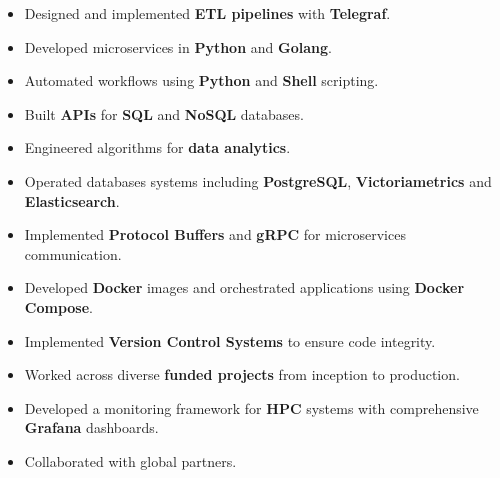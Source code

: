 \documentclass[10pt,a4paper,ragged2e,withhyper]{altacv}
\begin{document}
\begin{paracol}{2}
      \begin{itemize}
            \item Designed and implemented \textcolor{heading}{\textbf{ETL pipelines}} with
                  \textcolor{heading}{\textbf{Telegraf}}.
            \item Developed microservices in \textcolor{heading}{\textbf{Python}} and
                  \textcolor{heading}{\textbf{Golang}}.
            \item Automated workflows using \textcolor{heading}{\textbf{Python}} and
                  \textcolor{heading}{\textbf{Shell}} scripting.
            \item Built \textcolor{heading}{\textbf{APIs}} for \textcolor{heading}{\textbf{SQL}}
                  and \textcolor{heading}{\textbf{NoSQL}} databases.
            \item Engineered algorithms for \textcolor{heading}{\textbf{data analytics}}.
            \item Operated databases systems including \textcolor{heading}{\textbf{PostgreSQL}},
                  \textcolor{heading}{\textbf{Victoriametrics}} and
                  \textcolor{heading}{\textbf{Elasticsearch}}.
            \item Implemented \textcolor{heading}{\textbf{Protocol Buffers}} and
                  \textcolor{heading}{\textbf{gRPC}} for microservices communication.
            \item Developed \textcolor{heading}{\textbf{Docker}} images and orchestrated
                  applications using \textcolor{heading}{\textbf{Docker Compose}}.
            \item Implemented \textcolor{heading}{\textbf{Version Control Systems}} to ensure
                  code integrity.
            \item Worked across diverse \textcolor{heading}{\textbf{funded projects}} from
                  inception to production.
            \item Developed a monitoring framework for \textcolor{heading}{\textbf{HPC}} systems
                  with comprehensive \textcolor{heading}{\textbf{Grafana}} dashboards.
            \item Collaborated with global partners.

      \end{itemize}



\end{paracol}
\end{document}
